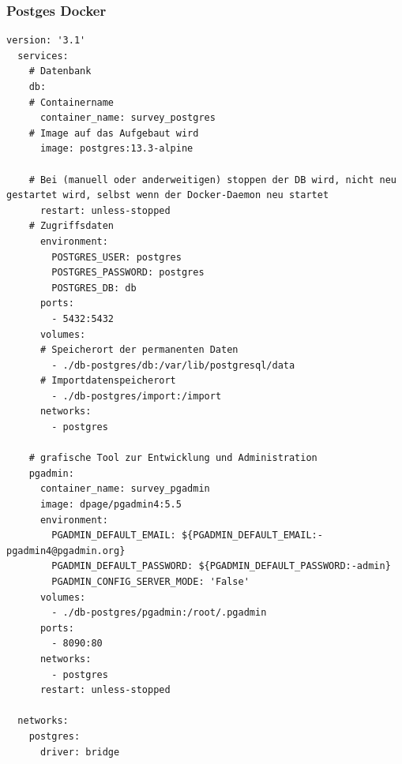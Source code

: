 \subsubsection{Postges Docker}
\begin{lstlisting}[caption=Postgres Dockerfile, label=lst:Postges Dockerfile]
  version: '3.1'
  services:
    # Datenbank
    db:
    # Containername
      container_name: survey_postgres
    # Image auf das Aufgebaut wird
      image: postgres:13.3-alpine
  
    # Bei (manuell oder anderweitigen) stoppen der DB wird, nicht neu gestartet wird, selbst wenn der Docker-Daemon neu startet
      restart: unless-stopped
    # Zugriffsdaten
      environment:
        POSTGRES_USER: postgres
        POSTGRES_PASSWORD: postgres
        POSTGRES_DB: db
      ports:
        - 5432:5432
      volumes:
      # Speicherort der permanenten Daten
        - ./db-postgres/db:/var/lib/postgresql/data
      # Importdatenspeicherort
        - ./db-postgres/import:/import
      networks:
        - postgres
  
    # grafische Tool zur Entwicklung und Administration
    pgadmin:
      container_name: survey_pgadmin
      image: dpage/pgadmin4:5.5
      environment:
        PGADMIN_DEFAULT_EMAIL: ${PGADMIN_DEFAULT_EMAIL:-pgadmin4@pgadmin.org}
        PGADMIN_DEFAULT_PASSWORD: ${PGADMIN_DEFAULT_PASSWORD:-admin}
        PGADMIN_CONFIG_SERVER_MODE: 'False'
      volumes:
        - ./db-postgres/pgadmin:/root/.pgadmin
      ports:
        - 8090:80
      networks:
        - postgres
      restart: unless-stopped
  
  networks:
    postgres:
      driver: bridge  
\end{lstlisting}

